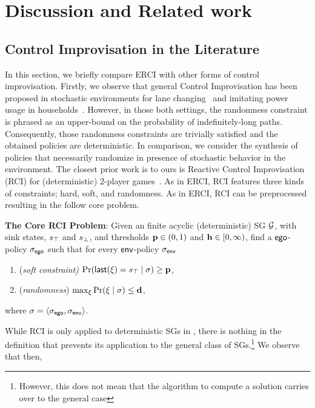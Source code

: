 \section{Discussion and Related work}\label{sec:related}

\subsection{Control Improvisation in the Literature}

In this section, we briefly compare ERCI with other forms of control
improvisation. Firstly, we observe that general Control Improvisation
has been proposed in stochastic environments for lane
changing~\cite{DBLP:conf/cdc/GeM18} and imitating power usage in
households~\cite{DBLP:conf/iotdi/AkkayaFVDLS16}. However, in those
both settings, the randomness constraint is phrased as an upper-bound
on the probability of indefinitely-long paths. Consequently, those
randomness constraints are trivially satisfied and the obtained
policies are deterministic.  In comparison, we consider the synthesis
of policies that necessarily randomize in presence of stochastic
behavior in the environment. The closest prior work is to ours
is Reactive Control Improvisation (RCI) for (deterministic) 2-player games~\cite{DBLP:conf/cav/FremontS18}. As in ERCI, RCI features
 three kinds of constraints; hard, soft, and randomness. As in ERCI,
RCI can be preprocessed resulting in the follow core problem.
\begin{mdframed}[nobreak=true]
  \textbf{The Core RCI Problem}: Given an finite acyclic
  (deterministic) SG $\mathcal{G}$, with sink states, $s_{\top}$ and $s_{\bot}$,
  and thresholds $\mathbf{p} \in (0,1)$ and
  $\mathbf{h} \in [0,\infty)$, find a $\mathsf{ego}$-policy ${\sigma_{\mathsf{ego}}}$
  such that for every $\mathsf{env}$-policy ${\sigma_{\mathsf{env}}}$
  \begin{enumerate}
  \item (\emph{soft constraint)}
    $\Pr(\mathsf{last}({\xi}) = s_{\top} \mid \sigma) \geq \mathbf{p}$,
  \item (\emph{randomness})
    $\max_\xi{\Pr(\xi\mid \sigma)} \leq \mathbf{d}$,
   \end{enumerate}
   where $\sigma = \langle {\sigma_{\mathsf{ego}}}, {\sigma_{\mathsf{env}}} \rangle$.
 \end{mdframed}
While RCI is only applied to deterministic SGs in
\cite{DBLP:conf/cav/FremontS18}, there is nothing in the definition
that prevents its application to the general class of
SGs.\footnote{However, this does not mean that the algorithm to compute
a solution carries over to the general case}  We observe that then,
